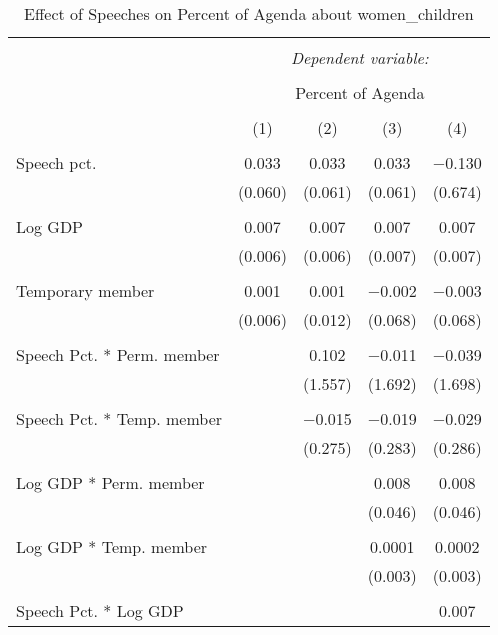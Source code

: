 
\begin{table}[!htbp] \centering 
  \caption{Effect of Speeches on Percent of Agenda about  women_children} 
  \label{} 
\begin{tabular}{@{\extracolsep{5pt}}lcccc} 
\\[-1.8ex]\hline 
\hline \\[-1.8ex] 
 & \multicolumn{4}{c}{\textit{Dependent variable:}} \\ 
\cline{2-5} 
\\[-1.8ex] & \multicolumn{4}{c}{Percent of Agenda} \\ 
\\[-1.8ex] & (1) & (2) & (3) & (4)\\ 
\hline \\[-1.8ex] 
 Speech pct. & 0.033 & 0.033 & 0.033 & $-$0.130 \\ 
  & (0.060) & (0.061) & (0.061) & (0.674) \\ 
  & & & & \\ 
 Log GDP & 0.007 & 0.007 & 0.007 & 0.007 \\ 
  & (0.006) & (0.006) & (0.007) & (0.007) \\ 
  & & & & \\ 
 Temporary member & 0.001 & 0.001 & $-$0.002 & $-$0.003 \\ 
  & (0.006) & (0.012) & (0.068) & (0.068) \\ 
  & & & & \\ 
 Speech Pct. * Perm. member &  & 0.102 & $-$0.011 & $-$0.039 \\ 
  &  & (1.557) & (1.692) & (1.698) \\ 
  & & & & \\ 
 Speech Pct. * Temp. member &  & $-$0.015 & $-$0.019 & $-$0.029 \\ 
  &  & (0.275) & (0.283) & (0.286) \\ 
  & & & & \\ 
 Log GDP * Perm. member &  &  & 0.008 & 0.008 \\ 
  &  &  & (0.046) & (0.046) \\ 
  & & & & \\ 
 Log GDP * Temp. member &  &  & 0.0001 & 0.0002 \\ 
  &  &  & (0.003) & (0.003) \\ 
  & & & & \\ 
 Speech Pct. * Log GDP &  &  &  & 0.007 \\ 

\end{tabular}
\end{table}
